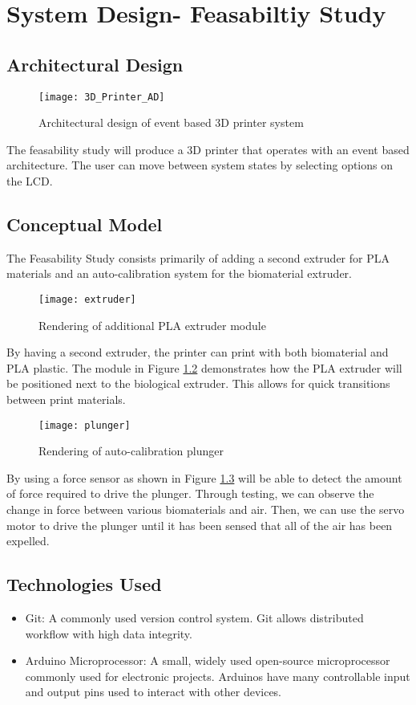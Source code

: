 \chapter{System Design- Feasabiltiy Study}

\section{Architectural Design}
\begin{figure}[H]
\texttt{[image: 3D\_Printer\_AD]}
\caption{\label{figure:3D_Printer_AD} Architectural design of event based 3D printer system}
\end{figure}

The feasability study will produce a 3D printer that operates with an event based architecture. The user can move between system states by selecting options on the LCD.

\section{Conceptual Model}

The Feasability Study consists primarily of adding a second extruder for PLA materials and an auto-calibration system for the biomaterial extruder.

\begin{figure}[H]
\texttt{[image: extruder]}
\caption{\label{figure:extruder} Rendering of additional PLA extruder module}
\end{figure}

By having a second extruder, the printer can print with both biomaterial and PLA plastic. The module in Figure \ref{figure:extruder} demonstrates how the PLA extruder will be positioned next to the biological extruder. This allows for quick transitions between print materials. 

\begin{figure}[H]
\texttt{[image: plunger]}
\caption{\label{figure:plunger} Rendering of auto-calibration plunger}
\end{figure}

By using a force sensor as shown in Figure \ref{figure:plunger} will be able to detect the amount of force required to drive the plunger. Through testing, we can observe the change in force between various biomaterials and air. Then, we can use the servo motor to drive the plunger until it has been sensed that all of the air has been expelled. 

\section{Technologies Used}
\begin{itemize}
\item Git: A commonly used version control system. Git allows distributed workflow with high data integrity.
\item Arduino Microprocessor: A small, widely used open-source microprocessor commonly used for electronic projects. Arduinos have many controllable input and output pins used to interact with other devices.
\end{itemize}

